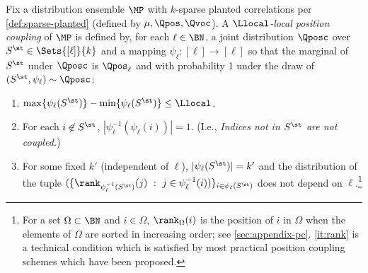 \begin{definition}
  \label{def:amenability}
  Fix a distribution ensemble $\MP$  with $k$-sparse planted correlations per \cref{def:sparse-planted} (defined by $\mu, \Qpos, \Qvoc$). A \emph{$\Llocal$-local position coupling} of $\MP$ is defined by,  for each $\ell \in \BN$, %
  a joint distribution $\Qposc$ over $S^\st \in \Sets{[\ell]}{k}$ and a mapping $\psi_{\ell} : [\ell] \to [\ell]$ so that the marginal of $S^\st$ under $\Qposc$ is $ \Qpos_\ell$ %
  and with probability 1 under the draw of $(S^\st, \psi_\ell) \sim \Qposc$: %
 \begin{enumerate}
 \item \label{it:local-coupling} $\max\{ \psi_\ell(S^\st) \} - \min \{ \psi_\ell(S^\st)\} \leq \Llocal$. %
 \item \label{it:collisions} For each $i \not \in S^\st$, $|\psi_\ell^{-1}(\psi_\ell(i))| = 1$. (I.e., \emph{Indices not in $S^\st$ are not coupled.})
 \item \label{it:rank} For some fixed $k'$ (independent of $\ell$), $|\psi_\ell(S^\st)| = k'$ and the distribution of the tuple $(\{\rank_{\psi_\ell^{-1}(S^\st)}(j) \ : \ j \in \psi_\ell^{-1}(i))\}_{i \in \psi_\ell(S^\st)}$ does not depend on $\ell$.\footnote{For a set $\Omega \subset \BN$ and $i \in \Omega$, $\rank_\Omega(i)$ is the position of $i$ in $\Omega$ when the elements of $\Omega$ are sorted in increasing order; see \cref{sec:appendix-pc}. \cref{it:rank} is a technical condition which is satisfied by most practical position coupling schemes which have been proposed.}
 \end{enumerate}
\end{definition}
